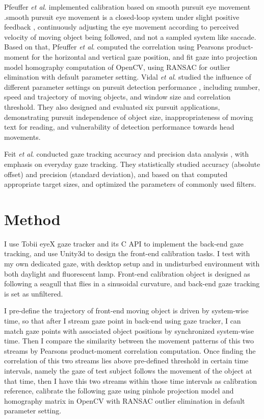 \documentclass{sigchi}
\begin{document}
Pfeuffer \textit{et al}. implemented calibration based on smooth pursuit eye movement \cite{pfeuffer2013pursuit}.smooth pursuit eye movement is a closed-loop system under slight positive feedback \cite{robinson1965mechanics}, continuously adjusting the eye movement according to perceived velocity of moving object being followed, and not a sampled system like saccade. Based on that, Pfeuffer \textit{et al}. computed the correlation using Pearson\textquotesingle s product-moment for the horizontal and vertical gaze position, and fit gaze into projection model homography computation of OpenCV, using RANSAC for outlier elimination with default parameter setting. Vidal \textit{et al}. studied the influence of different parameter settings on pursuit detection performance \cite{vidal2013pursuits}, including number, speed and trajectory of moving objects, and window size and correlation threshold. They also designed and evaluated six pursuit applications, demonstrating pursuit independence of object size, inappropriateness of moving text for reading, and vulnerability of detection performance towards head movements.

Feit \textit{et al}. conducted gaze tracking accuracy and precision data analysis \cite{feit2017toward}, with emphasis on everyday gaze tracking. They statistically studied accuracy (absolute offset) and precision (standard deviation), and based on that computed appropriate target sizes, and optimized the parameters of commonly used filters. 
\section{Method}
I use Tobii eyeX gaze tracker and its C API to implement the back-end gaze tracking, and use Unity3d to design the front-end calibration tasks. I test with my own dedicated gaze, with desktop setup and in undisturbed environment with both daylight and fluorescent lamp. Front-end calibration object is designed as following a seagull that flies in a sinusoidal curvature, and back-end gaze tracking is set as unfiltered.

I pre-define the trajectory of front-end moving object is driven by system-wise time, so that after I stream gaze point in back-end using gaze tracker, I can match gaze points with associated object positions by synchronized system-wise time. Then I compare the similarity between the movement patterns of this two streams by Pearson\textquotesingle s product-moment correlation computation. Once finding the correlation of this two streams lies above pre-defined threshold in certain time intervals, namely the gaze of test subject follows the movement of the object at that time, then I have this two streams within those time intervals as calibration reference, calibrate the following gaze using pinhole projection model and homography matrix in OpenCV with RANSAC outlier elimination in default parameter setting.
\end{document}
